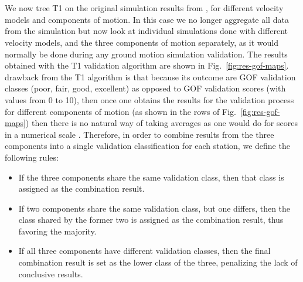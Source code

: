 
\section{}

We now  tree T1 on the original simulation results from \citet{Taborda_2014_BSSA}, for different velocity models and components of motion. In this case we no longer aggregate all data from the simulation but now look at individual simulations done with different velocity models, and the three components of motion separately, as it would normally be done during any ground motion simulation validation. The results obtained with the T1 validation algorithm are shown in Fig.~\ref{fig:res-gof-maps}. 
% 
% 
drawback from the T1 algorithm is that because its outcome are GOF validation classes (poor, fair, good, excellent) as opposed to GOF validation scores (with values from 0 to 10), then once one obtains the results for the validation process for different components of motion (as shown in the rows of Fig.~\ref{fig:res-gof-maps}) then there is no natural way of taking averages as one would do for scores in a numerical scale . Therefore, in order to combine results from the three components into a single validation classification for each station, we define the following rules:

\begin{itemize}
	\setlength\itemsep{0ex}
	\item If the three components share the same validation class, then that class is assigned as the combination result.
	\item If two components share the same validation class, but one differs, then the class shared by the former two is assigned as the combination result, thus favoring the majority.
	\item If all three components have different validation classes, then the final combination result is set as the lower class of the three, penalizing the lack of conclusive results.
\end{itemize}

